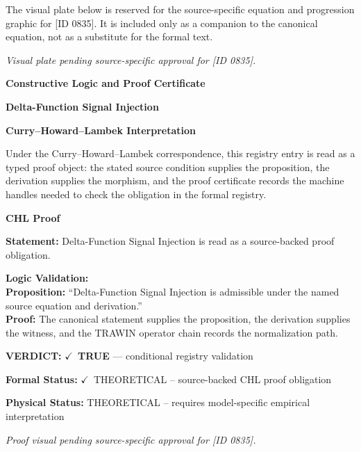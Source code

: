 \begingroup\footnotesize\sloppy
The visual plate below is reserved for the source-specific equation and progression graphic for [ID 0835]. It is included only as a companion to the canonical equation, not as a substitute for the formal text.
\par\endgroup
\begingroup\footnotesize\itshape
Visual plate pending source-specific approval for [ID 0835].
\par\endgroup

\clearpage
\begingroup\tzpsupportsetup
\noindent\textbf{\fontsize{10.8pt}{12.8pt}\selectfont [ID 0835] Constructive Logic and Proof Certificate}\par
\noindent\textbf{\fontsize{10pt}{12pt}\selectfont Delta-Function Signal Injection}\par
\vspace{0.45em}
\begingroup
\footnotesize
\setlength{\parskip}{0.22em}
\setlength{\parindent}{0pt}
\noindent\textbf{Curry--Howard--Lambek Interpretation}\par
Under the Curry--Howard--Lambek correspondence, this registry entry is read as a typed proof
object: the stated source condition supplies the proposition, the derivation supplies the
morphism, and the proof certificate records the machine handles needed to check the obligation
in the formal registry.

\vspace{0.45em}
\noindent\textbf{CHL Proof}\par
\textbf{Statement:} Delta-Function Signal Injection is read as a source-backed proof obligation.

\textbf{Logic Validation:}\\
\textbf{Proposition:} ``Delta-Function Signal Injection is admissible under the named source equation and derivation.''\\
\textbf{Proof:} The canonical statement supplies the proposition, the derivation supplies the witness, and the TRAWIN operator chain records the normalization path.

\textbf{VERDICT:} \ensuremath{\checkmark}\ \textbf{TRUE} --- conditional registry validation

\textbf{Formal Status:} \ensuremath{\checkmark}\ THEORETICAL -- source-backed CHL proof obligation

\textbf{Physical Status:} THEORETICAL -- requires model-specific empirical interpretation
\par\vspace{0.45em}
\par
\vfill
\begingroup\footnotesize\itshape
Proof visual pending source-specific approval for [ID 0835].
\par\endgroup
\vfill
\endgroup
\endgroup
